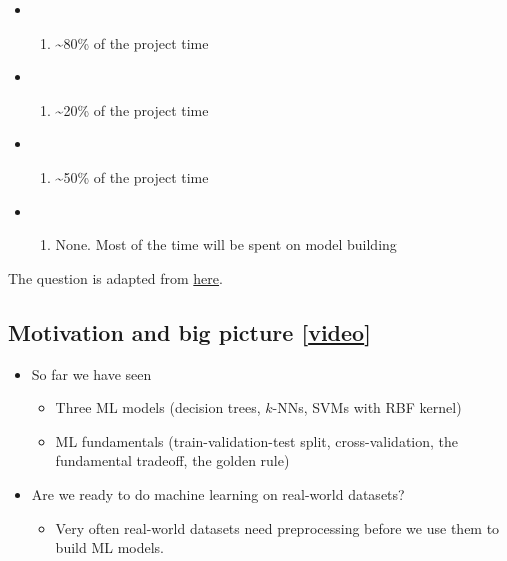 \documentclass[11pt]{article}
\providecommand{\tightlist}{%
      \setlength{\itemsep}{0pt}\setlength{\parskip}{0pt}}
\begin{document}
\begin{itemize}
\tightlist
\item
  \begin{enumerate}
  \def\labelenumi{(\Alph{enumi})}
  \tightlist
  \item
    \textasciitilde80\% of the project time
  \end{enumerate}
\item
  \begin{enumerate}
  \def\labelenumi{(\Alph{enumi})}
  \setcounter{enumi}{1}
  \tightlist
  \item
    \textasciitilde20\% of the project time
  \end{enumerate}
\item
  \begin{enumerate}
  \def\labelenumi{(\Alph{enumi})}
  \setcounter{enumi}{2}
  \tightlist
  \item
    \textasciitilde50\% of the project time
  \end{enumerate}
\item
  \begin{enumerate}
  \def\labelenumi{(\Alph{enumi})}
  \setcounter{enumi}{3}
  \tightlist
  \item
    None. Most of the time will be spent on model building
  \end{enumerate}
\end{itemize}

The question is adapted from
\href{https://developers.google.com/machine-learning/data-prep/process}{here}.

    

    \subsection{\texorpdfstring{Motivation and big picture
{[}\href{https://youtu.be/xx9HlmzORRk}{video}{]}}{Motivation and big picture {[}video{]}}}\label{motivation-and-big-picture-video}

    \begin{itemize}
\tightlist
\item
  So far we have seen

  \begin{itemize}
  \tightlist
  \item
    Three ML models (decision trees, \(k\)-NNs, SVMs with RBF kernel)
  \item
    ML fundamentals (train-validation-test split, cross-validation, the
    fundamental tradeoff, the golden rule)
  \end{itemize}
\item
  Are we ready to do machine learning on real-world datasets?

  \begin{itemize}
  \tightlist
  \item
    Very often real-world datasets need preprocessing before we use them
    to build ML models.
  \end{itemize}
\end{itemize}
\end{document}
